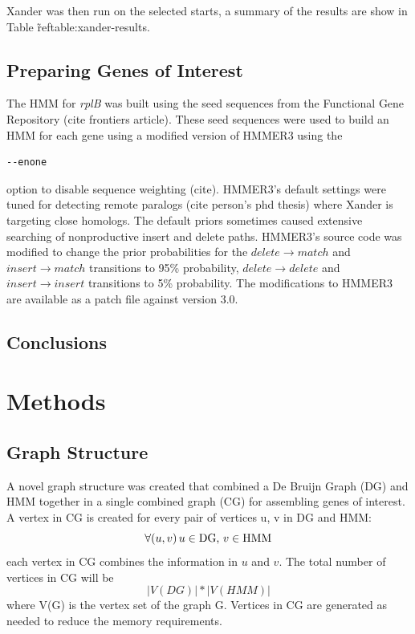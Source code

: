 \documentclass[10pt]{bmc_article}
\newenvironment{bmcformat}{\begin{raggedright}\baselineskip20pt\sloppy\setboolean{publ}{false}}{\end{raggedright}\baselineskip20pt\sloppy}
\begin{document}
\begin{bmcformat}
Xander was then run on the selected starts, a summary of the results are show in Table \~ref{table:xander-results}.

\subsection*{Preparing Genes of Interest}
The HMM for \emph{rplB} was built using the seed sequences from the Functional Gene Repository (cite frontiers article).  These seed sequences were used to build an HMM for each gene using a modified version of HMMER3 using the \begin{verbatim}--enone\end{verbatim} option to disable sequence weighting (cite). HMMER3's default settings were tuned for detecting remote paralogs (cite person's phd thesis) where Xander is targeting close homologs.  The default priors sometimes caused extensive searching of nonproductive insert and delete paths. HMMER3's source code was modified to change the prior probabilities for the $delete \rightarrow match$ and $insert \rightarrow match$ transitions to 95\% probability, $delete \rightarrow delete$ and $insert \rightarrow insert$ transitions to 5\% probability.  The modifications to HMMER3 are available as a patch file against version 3.0.

\subsection*{Conclusions}
  
\section*{Methods}
\subsection*{Graph Structure}
A novel graph structure was created that combined a De Bruijn Graph (DG) and HMM together in a single combined graph (CG) for assembling genes of interest.  A vertex in CG is created for every pair of vertices u, v in DG and HMM:
\[ \forall (u,v)\, u\in \textnormal{DG, }v\in \textnormal{HMM} \] each vertex in CG combines the information in $u$ and $v$.
The total number of vertices in CG will be \[|V(DG)| * |V(HMM)|\] where V(G) is the vertex set of the graph G.  Vertices in CG are generated as needed to reduce the memory requirements.


\end{bmcformat}
\end{document}
